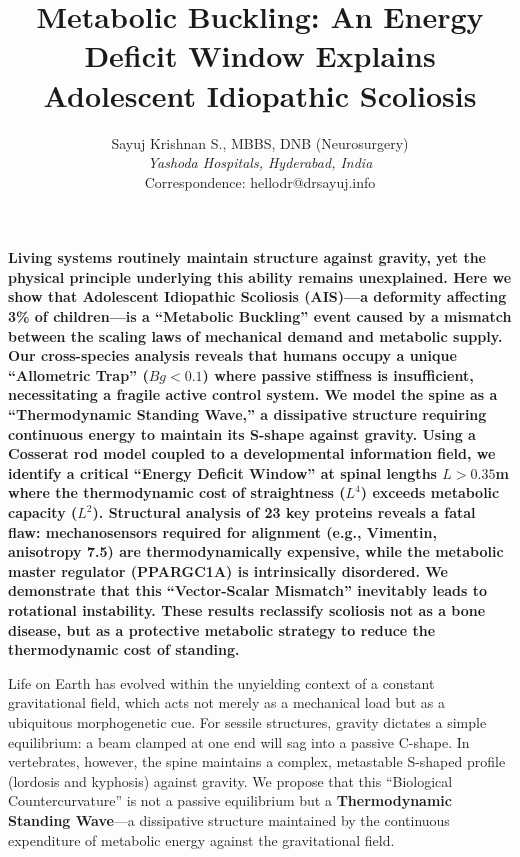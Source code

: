 \documentclass[11pt]{article}
\title{Metabolic Buckling: An Energy Deficit Window Explains Adolescent Idiopathic Scoliosis}
\author{Sayuj Krishnan S., MBBS, DNB (Neurosurgery) \\
\textit{Yashoda Hospitals, Hyderabad, India} \\
Correspondence: hellodr@drsayuj.info}
\date{}
\begin{document}
\maketitle

\textbf{Living systems routinely maintain structure against gravity, yet the physical principle underlying this ability remains unexplained. Here we show that Adolescent Idiopathic Scoliosis (AIS)—a deformity affecting 3\% of children—is a ``Metabolic Buckling'' event caused by a mismatch between the scaling laws of mechanical demand and metabolic supply. Our cross-species analysis reveals that humans occupy a unique ``Allometric Trap'' ($Bg < 0.1$) where passive stiffness is insufficient, necessitating a fragile active control system. We model the spine as a ``Thermodynamic Standing Wave,'' a dissipative structure requiring continuous energy to maintain its S-shape against gravity. Using a Cosserat rod model coupled to a developmental information field, we identify a critical ``Energy Deficit Window'' at spinal lengths $L > 0.35$m where the thermodynamic cost of straightness ($L^4$) exceeds metabolic capacity ($L^2$). Structural analysis of 23 key proteins reveals a fatal flaw: mechanosensors required for alignment (e.g., Vimentin, anisotropy 7.5) are thermodynamically expensive, while the metabolic master regulator (PPARGC1A) is intrinsically disordered. We demonstrate that this ``Vector-Scalar Mismatch'' inevitably leads to rotational instability. These results reclassify scoliosis not as a bone disease, but as a protective metabolic strategy to reduce the thermodynamic cost of standing.}

\vspace{1em}

Life on Earth has evolved within the unyielding context of a constant gravitational field, which acts not merely as a mechanical load but as a ubiquitous morphogenetic cue\cite{thompson1917}. For sessile structures, gravity dictates a simple equilibrium: a beam clamped at one end will sag into a passive C-shape. In vertebrates, however, the spine maintains a complex, metastable S-shaped profile (lordosis and kyphosis) against gravity\cite{latimer2005}. We propose that this ``Biological Countercurvature'' is not a passive equilibrium but a \textbf{Thermodynamic Standing Wave}—a dissipative structure maintained by the continuous expenditure of metabolic energy against the gravitational field.
\end{document}
